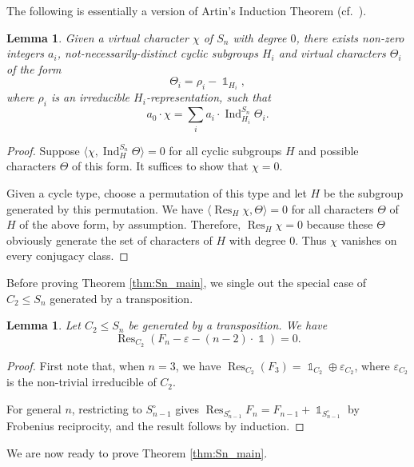 \documentclass[12pt]{amsart}
\newtheorem{lemma}[theorem]{Lemma}
\theoremstyle{definition}
\theoremstyle{remark}
\newcommand{\eps}{\varepsilon}
\DeclareMathOperator{\Res}{Res}
\DeclareMathOperator{\Ind}{Ind}
\DeclareMathOperator{\one}{\mathds{1}}
\begin{document}
The following is essentially a version of Artin's Induction Theorem (cf.\ \cite[\S9.2]{SerreReps}).

\begin{lemma}\label{lem:SnReps}
    Given a virtual character $\chi$ of $S_n$ with degree $0$, there exists non-zero integers $a_i$, not-necessarily-distinct cyclic subgroups $H_i$ and virtual characters $\Theta_i$ of the form
        \[\Theta_i=\rho_i-\one_{H_i},\] 
    where $\rho_i$ is an irreducible $H_i$-representation, such that
    \[a_0\cdot \chi=\sum_i a_i\cdot \Ind_{H_i}^{S_n}\Theta_i.\]
\end{lemma}

\begin{proof}
    Suppose $\langle\chi, \Ind_H^{S_n}\Theta\rangle=0$ for all cyclic subgroups $H$ and possible characters $\Theta$ of this form. It suffices to show that $\chi=0$.

    Given a cycle type, choose a permutation of this type and let $H$ be the subgroup generated by this permutation. We have $\langle\Res_H \chi,\Theta\rangle=0$ for all characters $\Theta$ of $H$ of the above form, by assumption. Therefore, $\Res_H\chi=0$ because these $\Theta$ obviously generate the set of characters of $H$ with degree $0$. Thus $\chi$ vanishes on every conjugacy class.
\end{proof}

Before proving Theorem \ref{thm:Sn_main}, we single out the special case of $C_2\le S_n$ generated by a transposition.

\begin{lemma}\label{lem:C2res}
    Let $C_2\le S_n$ be generated by a transposition. We have 
    \[\Res_{C_2} (F_n-\eps-(n-2)\cdot\one) = 0.\]
\end{lemma}

\begin{proof}
    First note that, when $n=3$, we have $\Res_{C_2}(F_3)=\one_{C_2} \oplus \eps_{C_2}$, where $\eps_{C_2}$ is the non-trivial irreducible of $C_2$.

    For general $n$, restricting to $S_{n-1}^\circ$ gives $\Res_{S_{n-1}^\circ}F_n=F_{n-1} + \one_{S_{n-1}^\circ}$ by Frobenius reciprocity, and the result follows by induction.
\end{proof}

We are now ready to prove Theorem \ref{thm:Sn_main}.
\end{document}
